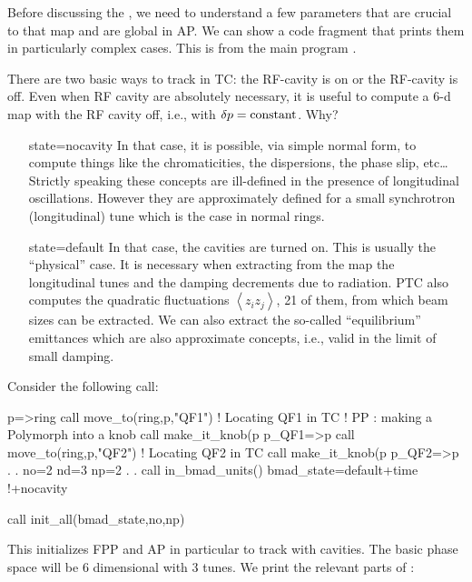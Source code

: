 \documentclass{hitec}     %
\def\tc{https://twikinew.ihep.ac.cn/pubfppptc/Web/Programs/}
\begin{document}
{{{{{{Before discussing the , we need to understand a few parameters that are crucial to that map and are global in AP. We can show a code fragment that prints them in  particularly complex cases.  This is from the main program \href{\tc z_track_c_.f90}{}.



There are two basic ways to track in TC: the RF-cavity is on or the RF-cavity is off. Even when RF cavity are absolutely necessary, it is useful to compute a 6-d map with the RF cavity off, i.e., with $\delta p = \rm constant$. Why?

\begin{enumerate}
\item [state=nocavity] In that case, it is possible, via simple normal form, to compute things like the chromaticities, the dispersions, the phase slip, etc\ldots  Strictly speaking these concepts are ill-defined in the presence of longitudinal oscillations. However they are approximately defined for a small synchrotron (longitudinal) tune which is the case in normal rings. 
\item [state=default] In that case,  the cavities are turned on. This is usually the ``physical'' case. It is necessary when extracting from the map the longitudinal tunes and the damping decrements due to radiation. PTC also computes the quadratic fluctuations $\left\langle{z_i z_j}\right\rangle$, 21 of them, from which beam sizes can be extracted. We can also extract the so-called ``equilibrium'' emittances which are also approximate concepts, i.e., valid in the limit of small damping.
\end{enumerate}
 
 Consider the following call:
 
\begin{code}
p=>ring%
call move_to(ring,p,"QF1")   !  Locating QF1 in TC
!  PP : making a Polymorph into a knob
call make_it_knob(p%
p_QF1=>p
call move_to(ring,p,"QF2")   ! Locating QF2 in TC
call make_it_knob(p%
p_QF2=>p
	.
	.
no=2
nd=3
np=2
	.
	.
call in_bmad_units()
bmad_state=default+time      !+nocavity

call init_all(bmad_state,no,np)
\end{code}
 
 This initializes FPP and AP in particular to track with cavities. The basic phase space will be 6 dimensional with 3 tunes. We print the relevant parts of :
 
}}}}}}
\end{document}

